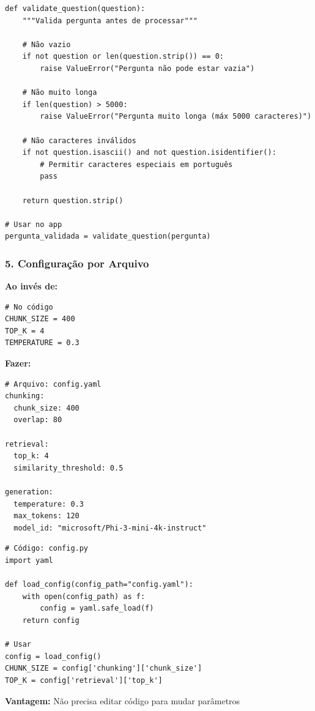 \documentclass[12pt,a4paper]{article}
\begin{document}
\begin{lstlisting}
def validate_question(question):
    """Valida pergunta antes de processar"""
    
    # Não vazio
    if not question or len(question.strip()) == 0:
        raise ValueError("Pergunta não pode estar vazia")
    
    # Não muito longa
    if len(question) > 5000:
        raise ValueError("Pergunta muito longa (máx 5000 caracteres)")
    
    # Não caracteres inválidos
    if not question.isascii() and not question.isidentifier():
        # Permitir caracteres especiais em português
        pass
    
    return question.strip()

# Usar no app
pergunta_validada = validate_question(pergunta)
\end{lstlisting}

\subsubsection{5. Configuração por Arquivo}

\textbf{Ao invés de:}

\begin{lstlisting}
# No código
CHUNK_SIZE = 400
TOP_K = 4
TEMPERATURE = 0.3
\end{lstlisting}

\textbf{Fazer:}

\begin{lstlisting}
# Arquivo: config.yaml
chunking:
  chunk_size: 400
  overlap: 80

retrieval:
  top_k: 4
  similarity_threshold: 0.5

generation:
  temperature: 0.3
  max_tokens: 120
  model_id: "microsoft/Phi-3-mini-4k-instruct"
\end{lstlisting}

\begin{lstlisting}
# Código: config.py
import yaml

def load_config(config_path="config.yaml"):
    with open(config_path) as f:
        config = yaml.safe_load(f)
    return config

# Usar
config = load_config()
CHUNK_SIZE = config['chunking']['chunk_size']
TOP_K = config['retrieval']['top_k']
\end{lstlisting}

\textbf{Vantagem:} Não precisa editar código para mudar parâmetros
\end{document}
